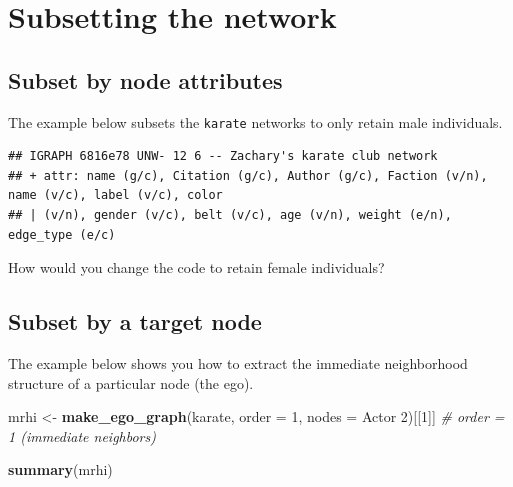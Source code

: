 \documentclass[
]{book}
\newenvironment{Shaded}{\begin{snugshade}}{\end{snugshade}}
\newcommand{\AttributeTok}[1]{\textcolor[rgb]{0.13,0.29,0.53}{#1}}
\newcommand{\CommentTok}[1]{\textcolor[rgb]{0.56,0.35,0.01}{\textit{#1}}}
\newcommand{\DecValTok}[1]{\textcolor[rgb]{0.00,0.00,0.81}{#1}}
\newcommand{\FunctionTok}[1]{\textcolor[rgb]{0.13,0.29,0.53}{\textbf{#1}}}
\newcommand{\NormalTok}[1]{#1}
\newcommand{\OtherTok}[1]{\textcolor[rgb]{0.56,0.35,0.01}{#1}}
\newcommand{\SpecialCharTok}[1]{\textcolor[rgb]{0.81,0.36,0.00}{\textbf{#1}}}
\newcommand{\StringTok}[1]{\textcolor[rgb]{0.31,0.60,0.02}{#1}}
\begin{document}
\section{Subsetting the network}\label{subsetting-the-network}

\subsection{Subset by node attributes}\label{subset-by-node-attributes}

The example below subsets the \texttt{karate} networks to only retain male individuals.

\begin{Shaded}
\end{Shaded}

\begin{verbatim}
## IGRAPH 6816e78 UNW- 12 6 -- Zachary's karate club network
## + attr: name (g/c), Citation (g/c), Author (g/c), Faction (v/n), name (v/c), label (v/c), color
## | (v/n), gender (v/c), belt (v/c), age (v/n), weight (e/n), edge_type (e/c)
\end{verbatim}

How would you change the code to retain female individuals?

\subsection{Subset by a target node}\label{subset-by-a-target-node}

The example below shows you how to extract the immediate neighborhood structure of a particular node (the ego).

\begin{Shaded}
\begin{Highlighting}[]
\NormalTok{mrhi }\OtherTok{\textless{}{-}} \FunctionTok{make\_ego\_graph}\NormalTok{(karate, }\AttributeTok{order =} \DecValTok{1}\NormalTok{, }\AttributeTok{nodes =} \StringTok{\textquotesingle{}Actor 2\textquotesingle{}}\NormalTok{)[[}\DecValTok{1}\NormalTok{]] }\CommentTok{\# order = 1 (immediate neighbors)}

\FunctionTok{summary}\NormalTok{(mrhi)}
\end{Highlighting}
\end{Shaded}
\end{document}
